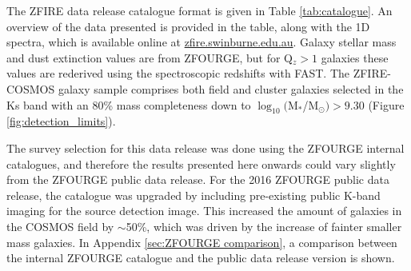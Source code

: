 \documentclass[iop]{emulateapj}
\newcommand{\around}{$\sim$}
\newcommand{\mass}{M$_*$/M$_\odot$}
\begin{document}
The ZFIRE data release catalogue format is given in Table \ref{tab:catalogue}.
An overview of the data presented is provided in the table, along with the 1D spectra, which is available online at \url{zfire.swinburne.edu.au}.
Galaxy stellar mass and dust extinction values are from ZFOURGE, but for Q$_z>1$ galaxies these values are rederived using the spectroscopic redshifts with FAST.
The ZFIRE-COSMOS galaxy sample comprises  both field and cluster galaxies selected in the Ks band with an 80\% mass completeness down to $\log_{10}($\mass$)>9.30$ (Figure \ref{fig:detection_limits}). 

The survey selection for this data release was done using the ZFOURGE internal catalogues, and therefore the results presented here onwards could vary slightly from the ZFOURGE public data release.  
For the 2016 ZFOURGE public data release, the catalogue was upgraded by including pre-existing public K-band imaging for the source detection image.
This increased the amount of galaxies in the COSMOS field by \around 50\%, which was driven by the increase of fainter smaller mass galaxies. In Appendix \ref{sec:ZFOURGE comparison}, a comparison between the internal ZFOURGE catalogue and the public data release version is shown. 
\end{document}
